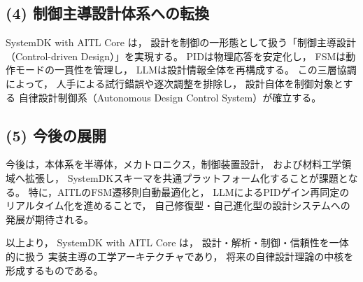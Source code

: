 \subsection{(4) 制御主導設計体系への転換}
SystemDK with AITL Core は，
設計を制御の一形態として扱う「制御主導設計（Control-driven Design）」を実現する。
PIDは物理応答を安定化し，
FSMは動作モードの一貫性を管理し，
LLMは設計情報全体を再構成する。
この三層協調によって，
人手による試行錯誤や逐次調整を排除し，
設計自体を制御対象とする
自律設計制御系（Autonomous Design Control System）が確立する。

\subsection{(5) 今後の展開}
今後は，本体系を半導体，メカトロニクス，制御装置設計，
および材料工学領域へ拡張し，
SystemDKスキーマを共通プラットフォーム化することが課題となる。
特に，AITLのFSM遷移則自動最適化と，
LLMによるPIDゲイン再同定のリアルタイム化を進めることで，
自己修復型・自己進化型の設計システムへの発展が期待される。

以上より，
SystemDK with AITL Core は，
設計・解析・制御・信頼性を一体的に扱う
実装主導の工学アーキテクチャであり，
将来の自律設計理論の中核を形成するものである。
